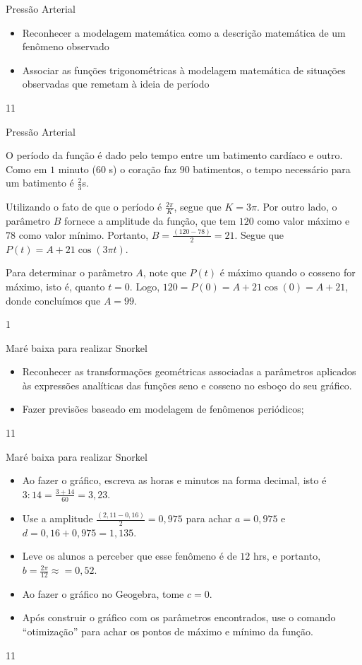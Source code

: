 \clearpage
\def\currentcolor{session2}
\begin{objectives}{Pressão Arterial}
{
\begin{itemize}
\item Reconhecer a modelagem matemática como a descrição matemática de um fenômeno observado
\item Associar as funções trigonométricas à modelagem matemática de situações observadas que remetam à ideia de período
\end{itemize}
}{1}{1}
\end{objectives}
\begin{answer}{Pressão Arterial}
{
O período da função é dado pelo tempo entre um batimento cardíaco e outro. Como em $1$ minuto ($60$ s) o coração faz $90$ batimentos, o tempo necessário para um batimento é $\frac{2}{3}$s. 

Utilizando o fato de que o período é $\frac{2\pi}{K}$, segue que $K = 3\pi$. Por outro lado, o parâmetro $B$ fornece a amplitude da função, que tem $120$ como valor máximo e $78$ como valor mínimo. Portanto, $B =\frac{(120-78)}{2} = 21$. Segue que $P(t) = A + 21\cos(3\pi t)$.

Para determinar o parâmetro $A$, note que $P(t)$ é máximo quando o cosseno for máximo, isto é, quanto $t = 0$. Logo, $120 = P(0) = A + 21\cos(0) = A + 21$, donde concluímos que $A = 99$.
}{1}
\end{answer}
\begin{objectives}{Maré baixa para realizar Snorkel}
{
\begin{itemize}
\item  Reconhecer as transformações geométricas associadas a
parâmetros aplicados às expressões analíticas das funções
seno e cosseno no esboço do seu gráfico.
\item Fazer previsões baseado em modelagem de fenômenos
periódicos;
\end{itemize}
}{1}{1}
\end{objectives}
\begin{sugestions}{Maré baixa para realizar Snorkel}
{
\begin{itemize}
\item Ao fazer o gráfico, escreva as horas e minutos na forma decimal, isto é $3:14=\frac{3+14}{60}=3{,}23$.
\item Use a amplitude $\frac{(2{,}11-0{,}16)}{2}=0{,}975$ para achar $a=0{,}975$ e $d=0{,}16+0{,}975=1{,}135$.
\item Leve os alunos a perceber que esse fenômeno é de $12$ hrs, e
portanto, $b=\frac{2\pi}{12}\approx=0{,}52$.
\item Ao fazer o gráfico no Geogebra, tome $c=0$.
\item Após construir o gráfico com os parâmetros encontrados, use o comando “otimização”{} para achar os pontos de máximo e mínimo da função.
\end{itemize}
}{1}{1} 
\end{sugestions}
